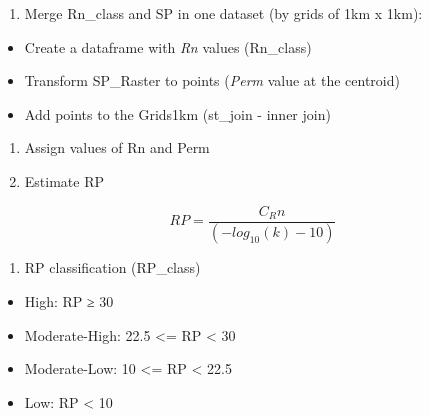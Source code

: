 \documentclass[
  12pt,
]{article}
\providecommand{\tightlist}{%
  \setlength{\itemsep}{0pt}\setlength{\parskip}{0pt}}
\begin{document}
\begin{enumerate}
\def\labelenumi{\alph{enumi})}
\tightlist
\item
  Merge Rn\_class and SP in one dataset (by grids of 1km x 1km):
\end{enumerate}

\begin{itemize}
\tightlist
\item
  Create a dataframe with \emph{Rn} values (Rn\_class)
\item
  Transform SP\_Raster to points (\emph{Perm} value at the centroid)
\item
  Add points to the Grids1km (st\_join - inner join)
\end{itemize}

\begin{enumerate}
\def\labelenumi{\alph{enumi})}
\setcounter{enumi}{1}
\tightlist
\item
  Assign values of Rn and Perm
\item
  Estimate RP
\end{enumerate}

\[ RP = \frac{C_Rn}{(-log_{10}(k) - 10)}\]

\begin{enumerate}
\def\labelenumi{\alph{enumi})}
\setcounter{enumi}{3}
\tightlist
\item
  RP classification (RP\_class)
\end{enumerate}

\begin{itemize}
\tightlist
\item
  High: RP ≥ 30
\item
  Moderate-High: 22.5 \textless= RP \textless{} 30
\item
  Moderate-Low: 10 \textless= RP \textless{} 22.5
\item
  Low: RP \textless{} 10
\end{itemize}
\end{document}
